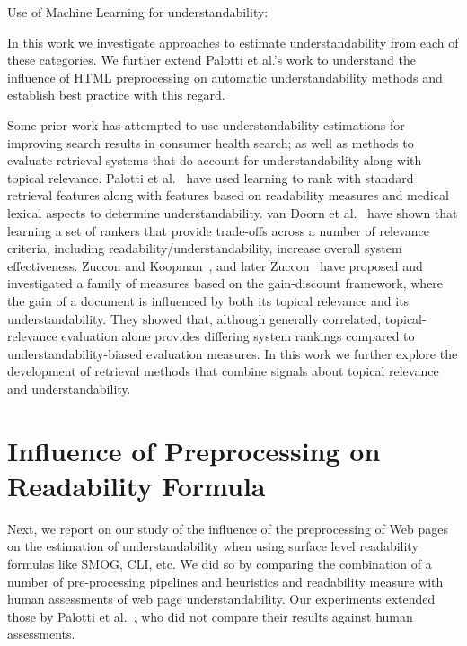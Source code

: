 Use of Machine Learning for understandability: 

In this work we investigate approaches to estimate understandability from each of these categories. We further extend Palotti et al.'s work to understand the influence of HTML preprocessing on automatic understandability methods and establish best practice with this regard. 

Some prior work has attempted to use understandability estimations for improving search results in consumer health search; as well as methods to evaluate retrieval systems that do account for understandability along with topical relevance. Palotti et al.~\cite{palotti2016ranking} have used learning to rank with standard retrieval features along with features based on readability measures and medical lexical aspects to determine
understandability. van Doorn et al.~\cite{van2016balancing} have shown that learning a set of rankers that provide trade-offs across a number of relevance criteria, including readability/understandability, increase overall system effectiveness.   
Zuccon and Koopman~\cite{zuccon14}, and later Zuccon~\cite{zuccon2016understandability} have proposed and investigated a family of measures based on the gain-discount framework, where the gain of a document is influenced by both its topical relevance and its understandability. They showed that, although generally correlated, topical-relevance evaluation alone provides differing system rankings compared to understandability-biased evaluation measures. 
In this work we further explore the development of retrieval methods that combine signals about topical relevance and understandability. 


\section{Influence of Preprocessing on Readability Formula}
\label{sec:which_readability}

Next, we report on our study of the influence of the preprocessing of Web pages on the estimation of understandability when using surface level readability formulas like SMOG, CLI, etc. We did so by comparing the combination of a number of pre-processing pipelines and heuristics and readability measure with human assessments of web page understandability. 
Our experiments extended those by Palotti et al.~\cite{palotti15}, who did not compare their results against human assessments. 

